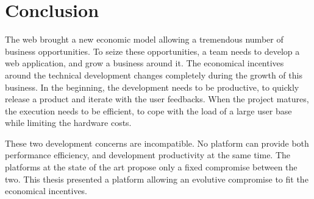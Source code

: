\chapter{Conclusion} \label{chapter7}
\minitoc
\eject

The web brought a new economic model allowing a tremendous number of business opportunities.
To seize these opportunities, a team needs to develop a web application, and grow a business around it.
The economical incentives around the technical development changes completely during the growth of this business.
In the beginning, the development needs to be productive, to quickly release a product and iterate with the user feedbacks.
When the project matures, the execution needs to be efficient, to cope with the load of a large user base while limiting the hardware costs.

These two development concerns are incompatible.
No platform can provide both performance efficiency, and development productivity at the same time.
The platforms at the state of the art propose only a fixed compromise between the two.
This thesis presented a platform allowing an evolutive compromise to fit the economical incentives.


